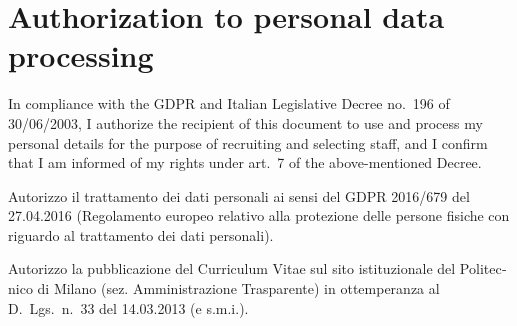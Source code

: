 \documentclass[11pt]{article}
\begin{document}
\section{Authorization to personal data processing}
{\small\color{muted}
In compliance with the GDPR and Italian Legislative Decree no.~196 of 30/06/2003, I authorize the recipient of this document to use and process my personal details for the purpose of recruiting and selecting staff, and I confirm that I am informed of my rights under art.~7 of the above-mentioned Decree.

\smallskip
\begin{otherlanguage}{italian}
Autorizzo il trattamento dei dati personali ai sensi del GDPR 2016/679 del 27.04.2016 (Regolamento europeo relativo alla protezione delle persone fisiche con riguardo al trattamento dei dati personali).

\smallskip
Autorizzo la pubblicazione del Curriculum Vitae sul sito istituzionale del Politecnico di Milano (sez. Amministrazione Trasparente) in ottemperanza al D.~Lgs.~n.~33 del 14.03.2013 (e s.m.i.).\par
\end{otherlanguage}}
\end{document}
